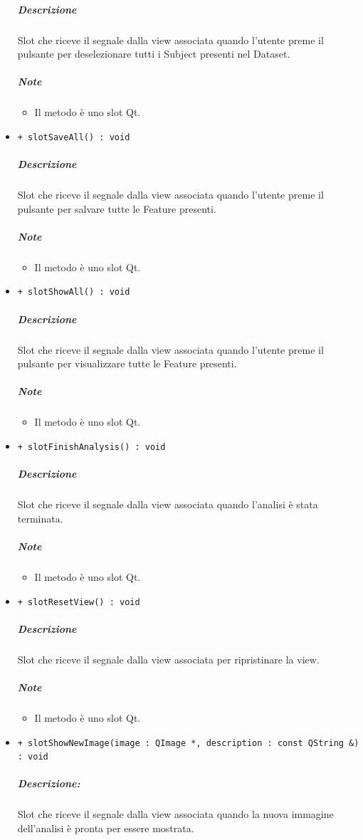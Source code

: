 \begin{itemize}
			\color{black}
			\subparagraph{Descrizione} Slot\g{} che riceve il segnale dalla view associata quando l'utente preme il pulsante per deselezionare tutti i Subject\g{} presenti nel Dataset\g{}.
			\subparagraph{Note}
			\begin{itemize}
				\item Il metodo è uno slot\g{} Qt\g{}.
			\end{itemize}
			\item \color{blue} \verb!+ slotSaveAll() : void!
			\color{black}
			\subparagraph{Descrizione} Slot\g{} che riceve il segnale dalla view associata quando l'utente preme il pulsante per salvare tutte le Feature\g{} presenti.
			\subparagraph{Note}
			\begin{itemize}
				\item Il metodo è uno slot\g{} Qt\g{}.
			\end{itemize}
			\item \color{blue} \verb!+ slotShowAll() : void!
			\color{black}
			\subparagraph{Descrizione} Slot\g{} che riceve il segnale dalla view associata quando l'utente preme il pulsante per visualizzare tutte le Feature\g{} presenti.
			\subparagraph{Note}
			\begin{itemize}
				\item Il metodo è uno slot\g{} Qt\g{}.
			\end{itemize}
			\item \color{blue} \verb!+ slotFinishAnalysis() : void!
			\color{black}
			\subparagraph{Descrizione} Slot\g{} che riceve il segnale dalla view associata quando l'analisi è stata terminata.
			\subparagraph{Note}
			\begin{itemize}
				\item Il metodo è uno slot\g{} Qt\g{}.
			\end{itemize}
			\item \color{blue} \verb!+ slotResetView() : void!
			\color{black}
			\subparagraph{Descrizione} Slot\g{} che riceve il segnale dalla view associata per ripristinare la view.
			\subparagraph{Note}
			\begin{itemize}
				\item Il metodo è uno slot\g{} Qt\g{}.
			\end{itemize}
			\item \color{blue} \verb!+ slotShowNewImage(image : QImage *, description : const QString &) : void!
			\color{black}
			\subparagraph{Descrizione:} Slot\g{} che riceve il segnale dalla view associata quando la nuova immagine dell'analisi è pronta per essere mostrata.

\end{itemize}
